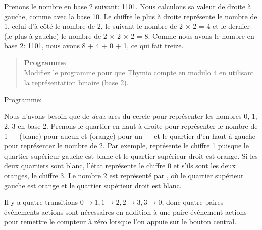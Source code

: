 Prenons le nombre en base 2 suivant: 1101.
Nous calculons sa valeur de droite à gauche, comme avec la base 10.
Le chiffre le plus à droite représente le nombre de 1, celui d'à côté le nombre de 2, le suivant le nombre de 2 $\times$ 2 = 4 et le dernier (le plus à gauche) le nombre de 2 $\times$ 2 $\times$ 2 = 8.
Comme nous avons le nombre en base 2: 1101, nous avons 8 + 4 + 0 + 1, ce qui fait treize.

\begin{quote}
\textbf{Programme}\\
Modifiez le programme pour que Thymio compte en modulo 4 en utilisant la représentation binaire (base 2).
\end{quote}

{\raggedleft \hfill Programme: }

Nous n'avons besoin que de \emph{deux} arcs du cercle
pour représenter les nombres 0, 1, 2, 3 en base 2.
Prenons le quartier en haut à droite pour représenter
le nombre de 1 ---  (blanc) pour aucun et  (orange) pour un --- et
le quartier d'en haut à gauche pour représenter le nombre de 2.
Par exemple,  représente le chiffre 1
puisque le quartier supérieur gauche est blanc
et le quartier supérieur droit est orange.
Si les deux quartiers sont blanc, l'état représente le chiffre 0 et s'ils sont les deux oranges, le chiffre 3.
Le nombre 2 est représenté par ,
où le quartier supérieur gauche est orange
et le quartier supérieur droit est blanc. 

Il y a quatre transitions $0\rightarrow 1, 1\rightarrow 2, 2
\rightarrow 3, 3\rightarrow 0$, donc quatre paires événements-actions sont nécessaires en addition à une paire événement-actions pour remettre le compteur à zéro lorsque l'on appuie sur le bouton central.

\bigskip


\bigskip




